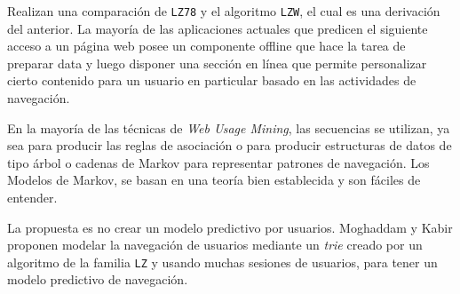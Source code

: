     Realizan una comparación de \texttt{LZ78}  y el algoritmo \texttt{LZW}, el cual es una derivación del anterior. La mayoría de las aplicaciones actuales que predicen el siguiente acceso a un página web posee un  componente offline que hace la tarea de preparar data y luego disponer una sección en línea que permite personalizar cierto contenido para un usuario en particular basado en las actividades de navegación.
	
	En la mayoría de las técnicas de \emph{Web Usage Mining}, las secuencias se utilizan, ya sea para producir las reglas de asociación o para producir estructuras de datos de tipo árbol o cadenas de Markov para representar patrones de navegación. Los  Modelos de Markov, se basan en una teoría bien establecida y son fáciles de entender.  
	

	La propuesta es no crear un modelo predictivo por usuarios.
	Moghaddam y Kabir proponen modelar la navegación de usuarios mediante un \emph{trie} creado por un algoritmo de la familia \texttt{LZ} y usando muchas sesiones de usuarios, para tener un modelo predictivo de navegación.